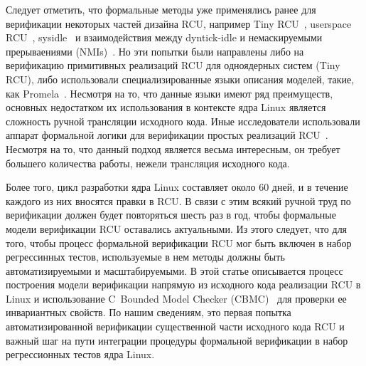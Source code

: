 Следует отметить, что формальные методы уже применялись ранее
для верификации некоторых частей дизайна RCU, например
Tiny RCU~\cite{VerificationChallenges}, userspace RCU~\cite{DesnoyersOSR13},
sysidle~\cite{VerificationChallenges} и взаимодействия между
dyntick-idle и немаскируемыми прерываениями (NMIs)~\cite{ValDyntickNMI}.
%
Но эти попытки были направлены либо на верификацию примитивных реализаций
RCU для одноядерных систем (Tiny RCU), либо использовали специализированные
языки описания моделей, такие, как Promela~\cite{HolzmannTSE97SPIN}.
Несмотря на то, что данные языки имеют ряд преимуществ,
основных недостатком их использования в контексте ядра Linux
является сложность ручной трансляции исходного кода.
%
Иные исследователи использовали аппарат формальной логики для
верификации простых реализаций RCU~\cite{YangESOP13RCU,DreyerPLDI15RCU}.
Несмотря на то, что данный подход является весьма интересным,
он требует большего количества работы, нежели трансляция исходного кода.

Более того, цикл разработки ядра Linux составляет около 60 дней,
и в течение каждого из них вносятся правки в RCU.
В связи с этим всякий ручной труд по верификации должен будет
повторяться шесть раз в год, чтобы формальные модели верификации RCU
оставались актуальными.
%
Из этого следует, что для того, чтобы процесс формальной верификации
RCU мог быть включен в набор регрессинных тестов, используемые в нем методы
должны быть автоматизируемыми и масштабируемыми.
%
В этой статье описывается процесс построения модели верификации напрямую из
исходного кода реализации RCU в Linux и использование
C~Bounded Model Checker (CBMC)~\cite{KroeningTACAS04CBMC}
для проверки ее инвариантных свойств.
%
По нашим сведениям, это первая попытка автоматизированной верификации существенной части
исходного кода RCU и важный шаг на пути интеграции процедуры формальной верификации
в набор регрессионных тестов ядра Linux.
